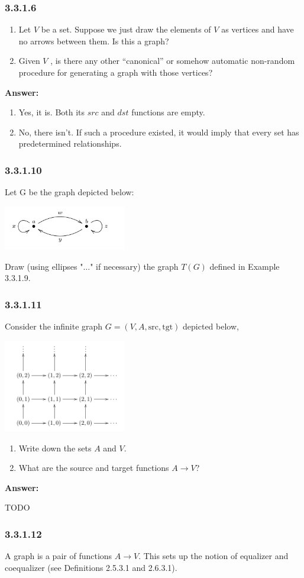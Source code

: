 \documentclass{article}
\newcommand{\vsp}[0]{\vspace*{10pt}\par}
\newcommand{\exercise}[1]{\subsubsection*{#1}}
\newcommand{\ans}[0]{\vsp\textbf{Answer: }\vsp}
\newcommand{\ei}{\item}
\newcommand{\es}{\begin{enumerate}[label=(\alph*)]\ei}
\newcommand{\ee}{\end{enumerate}}
\begin{document}
\exercise{3.3.1.6}

\es Let $V$ be a set. Suppose we just draw the elements of $V$ as vertices and
    have no arrows between them. Is this a graph?
\ei Given $V$ , is there any other “canonical” or somehow automatic non-random
    procedure for generating a graph with those vertices?
\ee

\ans

\es Yes, it is. Both its $src$ and $dst$ functions are empty.
\ei No, there isn't. If such a procedure existed, it would imply that every set has
    predetermined relationships.
\ee

\exercise{3.3.1.10}

Let G be the graph depicted below:

\begin{center}
\includegraphics[width=0.4\textwidth]{img/ex33110.png}
\end{center}

Draw (using ellipses "$\ldots$" if necessary) the graph $T(G)$ defined in Example
3.3.1.9.


\exercise{3.3.1.11}

Consider the infinite graph $G = (V, A, \text{src}, \text{tgt})$ depicted below,

\begin{center}
\includegraphics[width=0.4\textwidth]{img/ex33111.png}
\end{center}

\es Write down the sets $A$ and $V$.
\ei What are the source and target functions $A \to V$?
\ee

\ans

TODO


\exercise{3.3.1.12}

A graph is a pair of functions $A \to V$. This sets up the notion of equalizer
and coequalizer (see Definitions 2.5.3.1 and 2.6.3.1).
\end{document}
